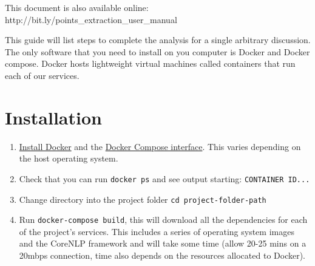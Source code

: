 This document is also available online: \\ http://bit.ly/points\_extraction\_user\_manual

\noindent\hrulefill

\noindent This guide will list steps to complete the analysis for a single arbitrary discussion. The only software that you need to install on you computer is Docker and Docker compose. Docker hosts lightweight virtual machines called containers that run each of our services.

\section{Installation}
\begin{enumerate}
	\item{\href{https://docs.docker.com/engine/installation/}{Install Docker} and the \href{https://docs.docker.com/compose/install/}{Docker Compose interface}. This varies depending on the host operating system.}
	\item{Check that you can run \texttt{docker ps} and see output starting: \texttt{CONTAINER ID...}}
	\item{Change directory into the project folder \texttt{cd {project-folder-path}}}
	\item{Run \texttt{docker-compose build}, this will download all the dependencies for each of the project's services. This includes a series of operating system images and the CoreNLP framework and will take some time (allow 20-25 mins on a 20mbps connection, time also depends on the resources allocated to Docker).}
\end{enumerate}

